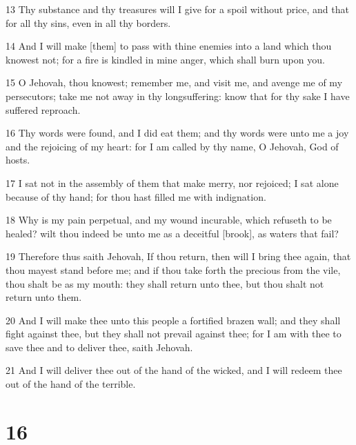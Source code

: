 \par 13 Thy substance and thy treasures will I give for a spoil without price, and that for all thy sins, even in all thy borders.
\par 14 And I will make [them] to pass with thine enemies into a land which thou knowest not; for a fire is kindled in mine anger, which shall burn upon you.
\par 15 O Jehovah, thou knowest; remember me, and visit me, and avenge me of my persecutors; take me not away in thy longsuffering: know that for thy sake I have suffered reproach.
\par 16 Thy words were found, and I did eat them; and thy words were unto me a joy and the rejoicing of my heart: for I am called by thy name, O Jehovah, God of hosts.
\par 17 I sat not in the assembly of them that make merry, nor rejoiced; I sat alone because of thy hand; for thou hast filled me with indignation.
\par 18 Why is my pain perpetual, and my wound incurable, which refuseth to be healed? wilt thou indeed be unto me as a deceitful [brook], as waters that fail?
\par 19 Therefore thus saith Jehovah, If thou return, then will I bring thee again, that thou mayest stand before me; and if thou take forth the precious from the vile, thou shalt be as my mouth: they shall return unto thee, but thou shalt not return unto them.
\par 20 And I will make thee unto this people a fortified brazen wall; and they shall fight against thee, but they shall not prevail against thee; for I am with thee to save thee and to deliver thee, saith Jehovah.
\par 21 And I will deliver thee out of the hand of the wicked, and I will redeem thee out of the hand of the terrible.

\chapter{16}

